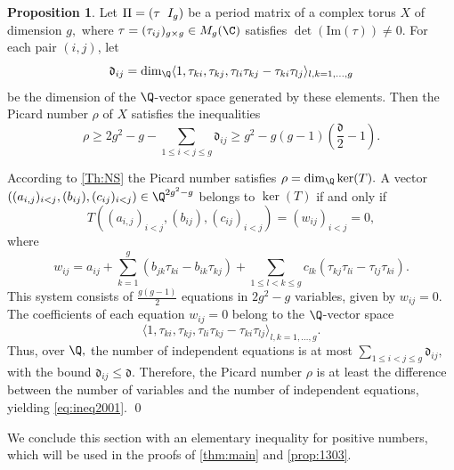 \documentclass[11pt,leqno]{article}
\theoremstyle{definition}
\newtheorem{proposition}{Proposition}[section]
\renewenvironment{proof}{{\bfseries \noindent Proof} }{ \qed \\}
\begin{document}
\begin{proposition}\label{NS1}
   Let $\Pi=(\tau\hspace{0.2cm}I_g)$ be a period matrix of a complex torus $X$ of dimension $g,$ where $\tau=(\tau_{ij})_{g\times g}\in M_g(\C)$ satisfies $\det(\mathrm{Im}(\tau))\neq0.$ For each pair $(i,j)$, let 
   $$\mathfrak{d}_{ij}=\dim_{\Q} \langle 1,\tau_{ki},\tau_{kj},\tau_{li}\tau_{kj}-\tau_{ki}\tau_{lj}\rangle_{l,k=1,\dots,g}$$ 
   be the dimension of the $\Q$-vector space generated by these elements. Then the Picard number $\rho$ of $X$ satisfies the inequalities
   \begin{equation}
    \label{eq:ineq2001}
   \rho\geq 2g^2-g-\sum_{1\leq i<j\leq g}\mathfrak{d}_{ij}\geq g^2-g(g-1)\left(\frac{\mathfrak{d}}{2}-1\right)  . 
   \end{equation}
\end{proposition}

\begin{proof}
According to \cref{Th:NS} the Picard number satisfies $\rho=\dim_\Q \ker(T).$ A vector $((a_{i,j})_{i<j},(b_{ij}),(c_{ij})_{i<j})\in\Q^{2g^2-g}$ belongs to $\ker(T)$ if and only if  
$$
T((a_{i,j})_{i<j},(b_{ij}),(c_{ij})_{i<j})=(w_{ij})_{i<j}=0,
$$
where
$$
w_{ij}=a_{ij}+\sum_{k=1}^g(b_{jk}\tau_{ki}-b_{ik}\tau_{kj})+\sum_{1\leq l< k\leq g}c_{lk}(\tau_{kj}\tau_{li}-\tau_{lj}\tau_{ki}).
 $$
This system consists of $\frac{g(g-1)}{2}$ equations in $2g^2-g$ variables, given by $w_{ij}=0$. The coefficients of each equation $w_{ij}=0$  belong to the $\Q$-vector space  
$$\langle 1,\tau_{ki},\tau_{kj},\tau_{li}\tau_{kj}-\tau_{ki}\tau_{lj}\rangle_{l,k=1,\dots,g}.$$ 
Thus, over $\Q,$ the number of independent equations is at most $\sum_{1\leq i<j\leq g}\mathfrak{d}_{ij},$ with the bound $\mathfrak{d}_{ij}\leq \mathfrak{d}.$ Therefore, the Picard number $\rho$ is at least the difference between the number of variables and the number of independent equations, yielding \cref{eq:ineq2001}.
\end{proof}





We conclude this section with an elementary inequality for positive numbers, which will be used in the proofs of \cref{thm:main} and \cref{prop:1303}.
\end{document}
